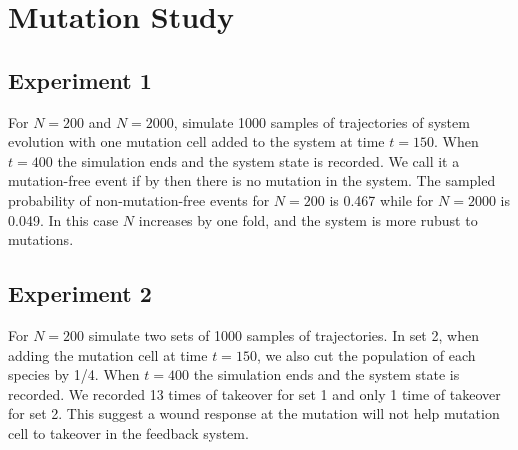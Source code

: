 \documentclass[12pt]{article}
\begin{document}
\section*{Mutation Study}

\subsection*{Experiment 1}
For $N=200$ and $N=2000$, simulate 1000 samples of trajectories
of system evolution with one mutation cell added to the system
at time $t=150$. When $t=400$ the simulation ends and the system
state is recorded. We call it a mutation-free event if by then 
there is no mutation in the system. The sampled probability
of non-mutation-free events for $N=200$ is 0.467 while 
for $N=2000$ is 0.049. In this case $N$ increases by one fold, 
and the system is more rubust to mutations.

\subsection*{Experiment 2}
For $N=200$ simulate two sets of 1000 samples of trajectories.
In set 2, when adding the mutation cell at time $t=150$,
we also cut the population of each species by 1/4. 
When $t=400$ the simulation ends and the system
state is recorded. We recorded 13 times of
takeover for set 1 and only 1 time of takeover 
for set 2. This suggest a wound response at the
mutation will not help mutation cell to takeover
in the feedback system.
\end{document}
